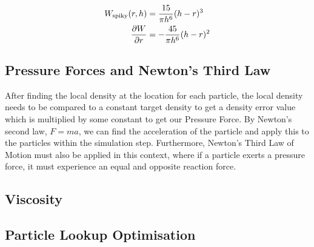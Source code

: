 \documentclass[write-up.tex]{subfiles}
\begin{document}
\begin{align*}
W_{\text{spiky}}(r, h) &= \displaystyle \frac{15}{\pi h^6} (h-r)^3 \\
\pdv{W}{r} &= -\frac{45}{\pi h^6} (h-r)^2
\end{align*}

\subsection{Pressure Forces and Newton's Third Law}

After finding the local density at the location for each particle, the local density needs to be compared to a constant target density to get a density error value which is multiplied by some constant to get our Pressure Force. By Newton's second law, $F = ma$, we can find the acceleration of the particle and apply this to the particles within the simulation step. Furthermore, Newton's Third Law of Motion must also be applied in this context, where if a particle exerts a pressure force, it must experience an equal and opposite reaction force.

\subsection{Viscosity}

\subsection{Particle Lookup Optimisation}
\end{document}
